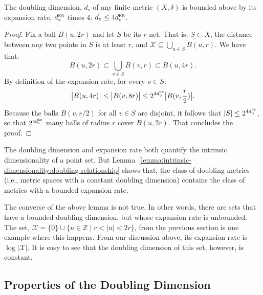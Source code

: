 \begin{lemma}
    \label{lemma:intrinsic-dimensionality:doubling-relationship}
    The doubling dimension, $d_\circ$ of any finite metric $(X, \delta)$
    is bounded above by its expansion rate, $d_\circ^{\textsc{kr}}$ times $4$:
    $d_\circ \leq 4 d_\circ^{\textsc{kr}}$.
\end{lemma}
\begin{proof}
    Fix a ball $B(u, 2r)$ and let $S$ be its $r$-net. That is,
    $S \subset X$, the distance
    between any two points in $S$ is at least $r$, and
    $\mathcal{X} \subseteq \bigcup_{u \in S} B(u, r)$. We have that:
    \begin{equation*}
        B(u, 2r) \subset \bigcup_{v \in S} B(v, r) \subset B(u, 4r).
    \end{equation*}
    By definition of the expansion rate, for every $v \in S$:
    \begin{equation*}
        \big\lvert B(u, 4r) \big\rvert \leq \big\lvert B(v, 8r) \big\rvert
        \leq 2^{4 d_\circ^{\textsc{kr}}} \big\lvert B(v, \frac{r}{2}) \big\rvert.
    \end{equation*}
    Because the balls $B(v, r/2)$ for all $v \in S$ are disjoint, it follows that
    $\lvert S \rvert \leq 2^{4 d_\circ^{\textsc{kr}}}$, so that
    $2^{4 d_\circ^{\textsc{kr}}}$ many balls of radius $r$ cover $B(u, 2r)$.
    That concludes the proof.
\end{proof}

\begin{svgraybox}
The doubling dimension and expansion rate both quantify the intrinsic dimensionality of a point set.
But Lemma~\ref{lemma:intrinsic-dimensionality:doubling-relationship}
shows that, the class of doubling metrics (i.e., metric spaces with a constant doubling dimension)
contains the class of metrics with a bounded expansion rate.
\end{svgraybox}

The converse of the above lemma is not true. In other words,
there are sets that have a bounded doubling dimension, but whose
expansion rate is unbounded. The set,
$\mathcal{X} = \{ 0 \} \cup \{ u \in \mathbb{Z} \;|\; r < \lvert u \rvert < 2r \}$,
from the previous section is one example where this happens.
From our discussion above, its expansion rate is $\log \lvert \mathcal{X} \rvert$.
It is easy to see that the doubling dimension of this set, however, is constant.

\subsection{Properties of the Doubling Dimension}


